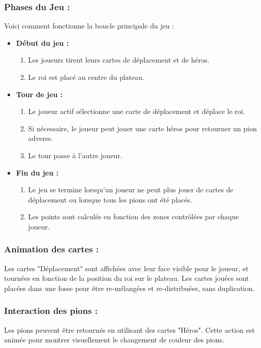 \subsubsection*{Phases du Jeu :}
Voici comment fonctionne la boucle principale du jeu :
\begin{itemize}
	\item \textbf{Début du jeu :}
	\begin{enumerate}
		\item Les joueurs tirent leurs cartes de déplacement et de héros.
		\item Le roi est placé au centre du plateau.
	\end{enumerate}
	\item \textbf{Tour de jeu :}
	\begin{enumerate}
		\item Le joueur actif sélectionne une carte de déplacement et déplace le roi.
		\item Si nécessaire, le joueur peut jouer une carte héros pour retourner un pion adverse.
		\item Le tour passe à l'autre joueur.
	\end{enumerate}
		\item \textbf{Fin du jeu :}
	\begin{enumerate}
		\item Le jeu se termine lorsqu'un joueur ne peut plus jouer de cartes de déplacement ou lorsque tous les pions ont été placés.
		\item Les points sont calculés en fonction des zones contrôlées par chaque joueur.
	\end{enumerate}
\end{itemize}


\subsubsection*{Animation des cartes :}
Les cartes "Déplacement" sont affichées avec leur face visible pour le joueur, et tournées en fonction de la position du roi sur le plateau. Les cartes jouées sont placées dans une fosse pour être re-mélangées et re-distribuées, sans duplication.

\subsubsection*{Interaction des pions :}
Les pions peuvent être retournés en utilisant des cartes "Héros". Cette action est animée pour montrer visuellement le changement de couleur des pions.

